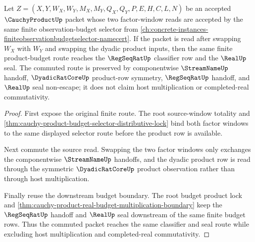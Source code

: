\begin{theorem}
\label{thm:cauchy-product-commuted-budget-route}
Let $Z=(X,Y,W_X,W_Y,M_X,M_Y,Q_X,Q_Y,P,E,H,C,L,N)$ be an accepted $\CauchyProductUp$ packet whose two factor-window reads are accepted by the same finite observation-budget selector from \autoref{ch:concrete-instances-finiteobservationbudgetselector-namecert}. If the packet is read after swapping $W_X$ with $W_Y$ and swapping the dyadic product inputs, then the same finite product-budget route reaches the $\RegSeqRatUp$ classifier row and the $\RealUp$ seal. The commuted route is preserved by componentwise $\StreamNameUp$ handoff, $\DyadicRatCoreUp$ product-row symmetry, $\RegSeqRatUp$ handoff, and $\RealUp$ seal non-escape; it does not claim host multiplication or completed-real commutativity.
\end{theorem}
\begin{proof}
First expose the original finite route. The root source-window totality and \autoref{thm:cauchy-product-budget-selector-distributive-lock} bind both factor windows to the same displayed selector route before the product row is available.

Next commute the source read. Swapping the two factor windows only exchanges the componentwise $\StreamNameUp$ handoffs, and the dyadic product row is read through the symmetric $\DyadicRatCoreUp$ product observation rather than through host multiplication.

Finally reuse the downstream budget boundary. The root budget product lock and \autoref{thm:cauchy-product-real-budget-multiplication-boundary} keep the $\RegSeqRatUp$ handoff and $\RealUp$ seal downstream of the same finite budget rows. Thus the commuted packet reaches the same classifier and seal route while excluding host multiplication and completed-real commutativity.
\end{proof}

